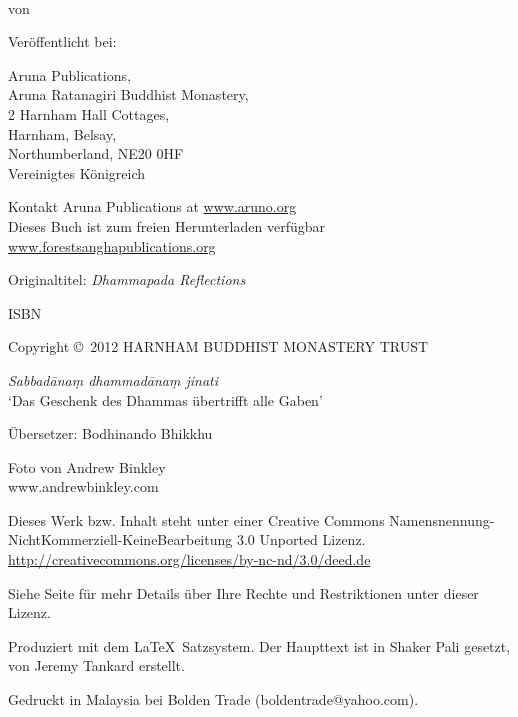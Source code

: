 {\smaller\setlength{\parskip}{0.8em}\setlength{\parindent}{0em}%
\raggedright%
\shaker\color[gray]{0.3}

\thetitle\\
von \theauthor

Veröffentlicht bei:

Aruna Publications,\\
Aruna Ratanagiri Buddhist Monastery,\\
2 Harnham Hall Cottages,\\
Harnham, Belsay,\\
Northumberland, NE20 0HF\\
Vereinigtes Königreich

Kontakt Aruna Publications at \href{http://aruno.org}{www.aruno.org}\\
Dieses Buch ist zum freien Herunterladen verfügbar\\
\href{http://forestsanghapublications.org/}{www.forestsanghapublications.org}

Originaltitel: \textit{Dhammapada Reflections}

ISBN \theISBN

Copyright \copyright\ 2012 HARNHAM BUDDHIST MONASTERY TRUST

\newpage

\textit{Sabbadānaṃ dhammadānaṃ jinati}\\
`Das Geschenk des Dhammas übertrifft alle Gaben'


Übersetzer: Bodhinando Bhikkhu

Foto von Andrew Binkley\\
www.andrewbinkley.com

{\tiny

Dieses Werk bzw. Inhalt steht unter einer Creative Commons Namensnennung-NichtKommerziell-KeineBearbeitung 3.0 Unported Lizenz.\\
\href{http://creativecommons.org/licenses/by-nc-nd/3.0/deed.de}{http://creativecommons.org/licenses/by-nc-nd/3.0/deed.de}

Siehe Seite \pageref{copyright-details} für mehr Details über Ihre Rechte und Restriktionen unter dieser Lizenz.

Produziert mit dem \LaTeX\ Satzsystem. Der Haupttext ist in Shaker Pali gesetzt, von Jeremy Tankard erstellt.

\theEditionInfo

Gedruckt in Malaysia bei Bolden Trade (boldentrade@yahoo.com).

}}

